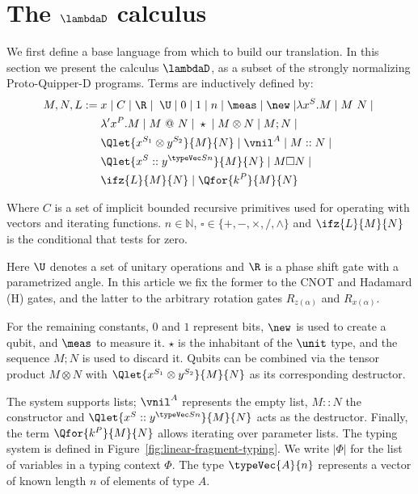 \section{The \texorpdfstring{$\lambdaD$}{lambda sub D} calculus}%
\label{sec:fragment}

We first define a base language from which to build our translation. In this section we present the calculus $\lambdaD$, as a subset of the strongly normalizing Proto-Quipper-D programs. Terms are inductively defined by:
\begin{align*}
    M, N, L :=\; & x \;|\; C \;|\; \R \;|\; \; \U \;|\; 0 \;|\; 1 \;|\; n \;|\; \meas \;|\; \new \;|
            \lambda x^S. M \;|\; M \ N \;|\;\\
        & \lambda' x^P. M \;|\; M\ @\ N \;|\;\star \;|\; M \otimes N \;|\; M;N \;|\; \\
        & \Qlet{x^{S_1} \otimes y^{S_2}}{M}{N} \;|\;\vnil^A \;|\; M :: N \;|\; \\
        & \Qlet{x^S :: y^{\typeVec S n}}{M}{N} \;|\;M \square N \;|\;\\
        & \ifz{L}{M}{N} \;|\; \Qfor{k^P}{M}{N}
\end{align*}

Where $C$ is a set of implicit bounded recursive primitives used for operating with vectors and iterating functions. $n\in\mathbb{N}$, $\square\in\{+, -, \times, / , \wedge\}$ and $\ifz{L}{M}{N}$ is the conditional that tests for zero.

Here $\U$ denotes a set of unitary operations and $\R$ is a phase shift gate with a parametrized angle. In this article we fix the former to the CNOT and Hadamard (H) gates, and the latter to the arbitrary rotation gates $R_{z(\alpha)}$ and $R_{x(\alpha)}$.

For the remaining constants, $0$ and $1$ represent bits, $\new$ is used to create a qubit, and $\meas$ to measure it. $\star$ is the inhabitant of the $\unit$ type, and the sequence $M;N$ is used to discard it. Qubits can be combined via the tensor product $M\otimes N$ with $\Qlet{x^{S_1} \otimes y^{S_2}}{M}{N}$ as its corresponding destructor.
 
The system supports lists; $\vnil^A$ represents the empty list, $M::N$ the constructor and $\Qlet{x^S :: y^{\typeVec S n}}{M}{N}$ acts as the destructor. Finally, the term $\Qfor{k^P}{M}{N}$ allows iterating over parameter lists. The typing system is defined in Figure~\ref {fig:linear-fragment-typing}. We write $|\Phi|$ for the list of variables in a typing context $\Phi$. The type $\typeVec{A}{n}$ represents a vector of known length $n$ of elements of type $A$.

